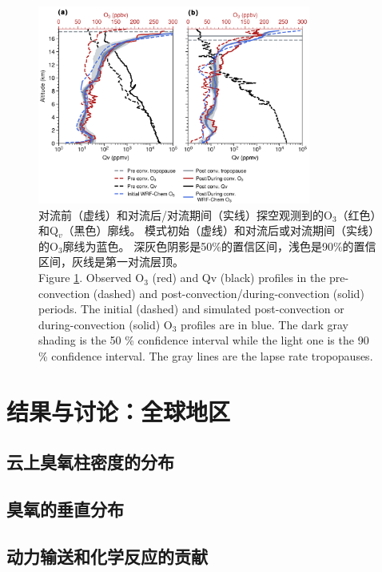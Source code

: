 \begin{figure}[htbp]
\centering
\includegraphics[width=0.8\textwidth]{./figures/ozonesonde_profile.png}
\caption{对流前（虚线）和对流后/对流期间（实线）探空观测到的O$_3$（红色）和Q$_v$（黑色）廓线。
模式初始（虚线）和对流后或对流期间（实线）的O$_3$廓线为蓝色。
深灰色阴影是50\%的置信区间，浅色是90\%的置信区间，灰线是第一对流层顶。\\
Figure \ref{fig:ozonesonde_profile}. Observed O$_3$ (red) and Qv (black) profiles in the pre-convection (dashed) and post-convection/during-convection (solid) periods.
The initial (dashed) and simulated post-convection or during-convection (solid) O$_3$ profiles are in blue.
The dark gray shading is the 50 \% confidence interval while the light one is the 90 \% confidence interval.
The gray lines are the lapse rate tropopauses.
}
\label{fig:ozonesonde_profile}
\end{figure}




\section{结果与讨论：全球地区}

\subsection{云上臭氧柱密度的分布}

\subsection{臭氧的垂直分布}

\subsection{动力输送和化学反应的贡献}

